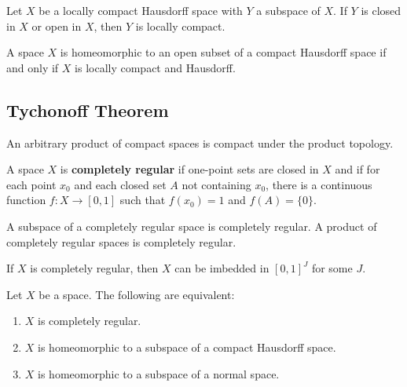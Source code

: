   \begin{corollary}
    Let $X$ be a locally compact Hausdorff space with $Y$ a subspace of $X$. If $Y$ is closed in $X$ or open in $X$, then $Y$ is locally compact. 
  \end{corollary}

  \begin{corollary}
    A space $X$ is homeomorphic to an open subset of a compact Hausdorff space if and only if $X$ is locally compact and Hausdorff. 
  \end{corollary}

\subsection{Tychonoff Theorem}

  \begin{theorem}
    An arbitrary product of compact spaces is compact under the product topology. 
  \end{theorem}

  \begin{definition}
    A space $X$ is \textbf{completely regular} if one-point sets are closed in $X$ and if for each point $x_0$ and each closed set $A$ not containing $x_0$, there is a continuous function $f: X \longrightarrow [0,1]$ such that $f(x_0) = 1$ and $f(A) = \{0\}$. 
  \end{definition}

  \begin{theorem}
    A subspace of a completely regular space is completely regular. A product of completely regular spaces is completely regular. 
  \end{theorem}

  \begin{theorem}
    If $X$ is completely regular, then $X$ can be imbedded in $[0,1]^J$ for some $J$. 
  \end{theorem}

  \begin{corollary}
    Let $X$ be a space. The following are equivalent: 
    \begin{enumerate}
      \item $X$ is completely regular. 
      \item $X$ is homeomorphic to a subspace of a compact Hausdorff space. 
      \item $X$ is homeomorphic to a subspace of a normal space. 
    \end{enumerate}
  \end{corollary}

